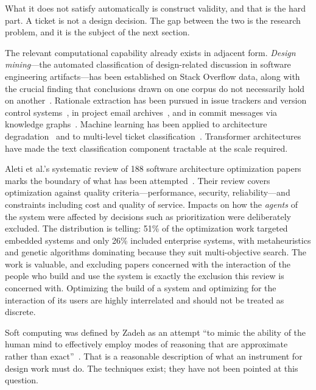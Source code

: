 \documentclass[11pt,a4paper]{article}
\begin{document}
What it does not satisfy automatically is construct validity, and that is the
hard part. A ticket is not a design decision. The gap between the two is the
research problem, and it is the subject of the next section.

The relevant computational capability already exists in adjacent form.
\emph{Design mining}---the automated classification of design-related
discussion in software engineering artifacts---has been established on Stack
Overflow data, along with the crucial finding that conclusions drawn on one
corpus do not necessarily hold on another~\citep{mahadi2021}. Rationale
extraction has been pursued in issue trackers and version control
systems~\citep{kleebaum2021}, in project email archives~\citep{sharma2021}, and
in commit messages via knowledge graphs~\citep{dhaouadi2023}. Machine learning
has been applied to architecture degradation~\citep{herold2020} and to
multi-level ticket classification~\citep{zangari2023}. Transformer
architectures~\citep{devlin2019} have made the text classification component
tractable at the scale required.

Aleti et al.'s systematic review of 188 software architecture optimization
papers marks the boundary of what has been attempted~\citep{aleti2013}. Their
review covers optimization against quality criteria---performance, security,
reliability---and constraints including cost and quality of service. Impacts on
how the \emph{agents} of the system were affected by decisions such as
prioritization were deliberately excluded. The distribution is telling: 51\% of
the optimization work targeted embedded systems and only 26\% included
enterprise systems, with metaheuristics and genetic algorithms dominating
because they suit multi-objective search. The work is valuable, and excluding
papers concerned with the interaction of the people who build and use the system
is exactly the exclusion this review is concerned with. Optimizing the build of
a system and optimizing for the interaction of its users are highly interrelated
and should not be treated as discrete.

Soft computing was defined by Zadeh as an attempt ``to mimic the ability of the
human mind to effectively employ modes of reasoning that are approximate rather
than exact''~\citep{zadeh1994}. That is a reasonable description of what an
instrument for design work must do. The techniques exist; they have not been
pointed at this question.

\end{document}
